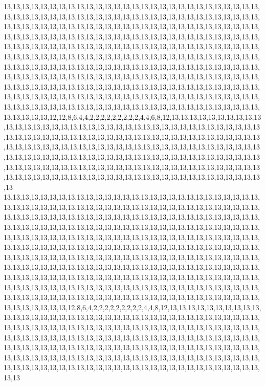 13,13,13,13,13,13,13,13,13,13,13,13,13,13,13,13,13,13,13,13,13,13,13,13,13,13,13,13,13,13,13,13,13,13,13,13,13,13,13,13,13,13,13,13,13,13,13,13,13,13,13,13,13,13,13,13,13,13,13,13,13,13,13,13,13,13,13,13,13,13,13,13,13,13,13,13,13,13,13,13,13,13,13,13,13,13,13,13,13,13,13,13,13,13,13,13,13,13,13,13,13,13,13,13,13,13,13,13,13,13,13,13,13,13,13,13,13,13,13,13,13,13,13,13,13,13,13,13,13,13,13,13,13,13,13,13,13,13,13,13,13,13,13,13,13,13,13,13,13,13,13,13,13,13,13,13,13,13,13,13,13,13,13,13,13,13,13,13,13,13,13,13,13,13,13,13,13,13,13,13,13,13,13,13,13,13,13,13,13,13,13,13,13,13,13,13,13,13,13,13,13,13,13,13,13,13,13,13,13,13,13,13,13,13,13,13,13,13,13,13,13,13,13,13,13,13,13,13,13,13,13,13,13,13,13,13,13,13,13,13,13,13,13,13,13,13,13,13,13,13,13,13,13,13,13,13,13,13,13,13,13,13,13,13,13,13,13,13,13,13,13,13,13,13,13,13,13,13,13,13,13,13,13,13,13,13,13,13,13,13,13,13,13,13,13,13,13,13,13,13,13,13,13,13,13,13,13,13,13,13,13,13,13,12,12,8,6,4,4,2,2,2,2,2,2,2,2,2,4,4,6,8,12,13,13,13,13,13,13,13,13,13,13,13,13,13,13,13,13,13,13,13,13,13,13,13,13,13,13,13,13,13,13,13,13,13,13,13,13,13,13,13,13,13,13,13,13,13,13,13,13,13,13,13,13,13,13,13,13,13,13,13,13,13,13,13,13,13,13,13,13,13,13,13,13,13,13,13,13,13,13,13,13,13,13,13,13,13,13,13,13,13,13,13,13,13,13,13,13,13,13,13,13,13,13,13,13,13,13,13,13,13,13,13,13,13,13,13,13,13,13,13,13,13,13,13,13,13,13,13,13,13,13,13,13,13,13,13,13,13,13,13,13,13,13,13,13,13,13,13,13,13,13,13,13,13,13,13,13,13,13,13,13,13,13,13,13,13,13,13,13,13,13,13,13,13,13,13,13,13,13,13
13,13,13,13,13,13,13,13,13,13,13,13,13,13,13,13,13,13,13,13,13,13,13,13,13,13,13,13,13,13,13,13,13,13,13,13,13,13,13,13,13,13,13,13,13,13,13,13,13,13,13,13,13,13,13,13,13,13,13,13,13,13,13,13,13,13,13,13,13,13,13,13,13,13,13,13,13,13,13,13,13,13,13,13,13,13,13,13,13,13,13,13,13,13,13,13,13,13,13,13,13,13,13,13,13,13,13,13,13,13,13,13,13,13,13,13,13,13,13,13,13,13,13,13,13,13,13,13,13,13,13,13,13,13,13,13,13,13,13,13,13,13,13,13,13,13,13,13,13,13,13,13,13,13,13,13,13,13,13,13,13,13,13,13,13,13,13,13,13,13,13,13,13,13,13,13,13,13,13,13,13,13,13,13,13,13,13,13,13,13,13,13,13,13,13,13,13,13,13,13,13,13,13,13,13,13,13,13,13,13,13,13,13,13,13,13,13,13,13,13,13,13,13,13,13,13,13,13,13,13,13,13,13,13,13,13,13,13,13,13,13,13,13,13,13,13,13,13,13,13,13,13,13,13,13,13,13,13,13,13,13,13,13,13,13,13,13,13,13,13,13,13,13,13,13,13,13,13,13,13,13,13,13,13,13,13,13,13,13,13,13,13,13,13,13,13,13,13,13,13,13,13,13,13,13,13,13,13,13,13,13,13,13,13,13,12,8,6,4,2,2,2,2,2,2,2,2,2,4,4,8,12,13,13,13,13,13,13,13,13,13,13,13,13,13,13,13,13,13,13,13,13,13,13,13,13,13,13,13,13,13,13,13,13,13,13,13,13,13,13,13,13,13,13,13,13,13,13,13,13,13,13,13,13,13,13,13,13,13,13,13,13,13,13,13,13,13,13,13,13,13,13,13,13,13,13,13,13,13,13,13,13,13,13,13,13,13,13,13,13,13,13,13,13,13,13,13,13,13,13,13,13,13,13,13,13,13,13,13,13,13,13,13,13,13,13,13,13,13,13,13,13,13,13,13,13,13,13,13,13,13,13,13,13,13,13,13,13,13,13,13,13,13,13,13,13,13,13,13,13,13,13,13,13,13,13,13,13,13,13,13,13,13,13,13,13,13,13,13,13,13,13,13,13,13,13,13,13,13,13,13,13
